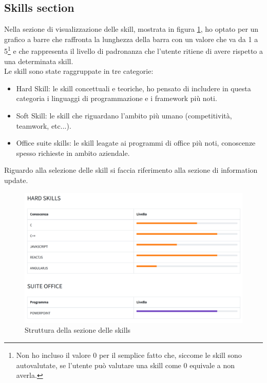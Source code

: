 \subsection{Skills section}
Nella sezione di visualizzazione delle skill, mostrata in figura \ref{fig:skillVisualization}, ho optato per un grafico a barre che raffronta la lunghezza della barra con un valore che va da 1 a 5\footnote{
Non ho incluso il valore 0 per il semplice fatto che, siccome le skill sono autovalutate, se l'utente può valutare una skill come 0 equivale a non averla.
} e che rappresenta il livello di padronanza che l'utente ritiene di avere rispetto a una determinata skill.
\\
Le skill sono state raggruppate in tre categorie:
\begin{itemize}
    \item Hard Skill: le skill concettuali e teoriche, ho pensato di includere in questa categoria i linguaggi di programmazione e i framework più noti.
    \item Soft Skill: le skill che riguardano l'ambito più umano (competitività, teamwork, etc...).
    \item Office suite skills: le skill leagate ai programmi di office più noti, conoscenze spesso richieste in ambito aziendale.
\end{itemize}
Riguardo alla selezione delle skill si faccia riferimento alla sezione di information update.

\begin{figure}[h]
    \centering
    \includegraphics[width=450px]{./images/skills.png}
    \caption{Struttura della sezione delle skills}
    \label{fig:skillVisualization}
\end{figure}

